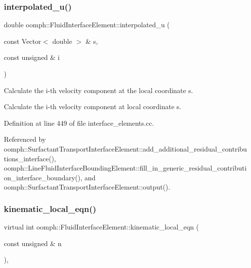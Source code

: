 \subsubsection{\texorpdfstring{interpolated\+\_\+u()}{interpolated\_u()}}
{\footnotesize\ttfamily double oomph\+::\+Fluid\+Interface\+Element\+::interpolated\+\_\+u (\begin{DoxyParamCaption}\item[{const Vector$<$ double $>$ \&}]{s,  }\item[{const unsigned \&}]{i }\end{DoxyParamCaption})}



Calculate the i-\/th velocity component at the local coordinate s. 

Calculate the i-\/th velocity component at local coordinate s. 

Definition at line 449 of file interface\+\_\+elements.\+cc.



Referenced by oomph\+::\+Surfactant\+Transport\+Interface\+Element\+::add\+\_\+additional\+\_\+residual\+\_\+contributions\+\_\+interface(), oomph\+::\+Line\+Fluid\+Interface\+Bounding\+Element\+::fill\+\_\+in\+\_\+generic\+\_\+residual\+\_\+contribution\+\_\+interface\+\_\+boundary(), and oomph\+::\+Surfactant\+Transport\+Interface\+Element\+::output().

\mbox{\label{classoomph_1_1FluidInterfaceElement_a58a82e2fd839d4381e43d46a22bf1f25}} 
\subsubsection{\texorpdfstring{kinematic\+\_\+local\+\_\+eqn()}{kinematic\_local\_eqn()}}
{\footnotesize\ttfamily virtual int oomph\+::\+Fluid\+Interface\+Element\+::kinematic\+\_\+local\+\_\+eqn (\begin{DoxyParamCaption}\item[{const unsigned \&}]{n }\end{DoxyParamCaption})\hspace{0.3cm}{\ttfamily [protected]}, {}}




